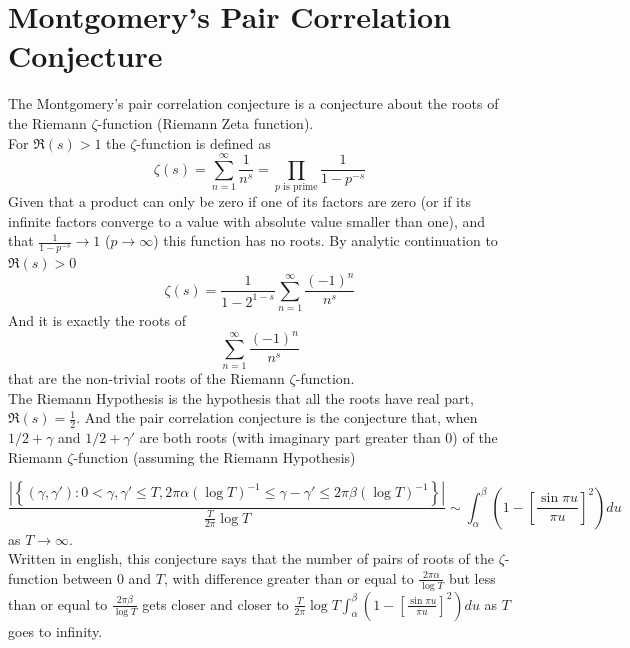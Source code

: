 \section{Montgomery's Pair Correlation Conjecture}
The Montgomery's pair correlation conjecture is a conjecture about the roots of the Riemann 
$\zeta$-function (Riemann Zeta function).
\\
For $\Re(s)>1$ the $\zeta$-function is defined as
\[\zeta(s)=\sum_{n=1}^\infty\frac{1}{n^s}=\prod_{p\text{ is prime}} \frac{1}{1-p^{-s}}\]
Given that a product can only be zero if one of its factors are zero (or if its infinite
factors converge to a value with absolute value smaller than one), and that 
$\frac{1}{1-p^{-s}}\rightarrow 1$ ($p\rightarrow\infty$) this function has no roots. 
By analytic continuation to $\Re(s)>0$
\[\zeta(s)=\frac{1}{1-2^{1-s}}\sum_{n=1}^\infty \frac{(-1)^n}{n^s}\]
And it is exactly the roots of 
\[\sum_{n=1}^\infty \frac{(-1)^n}{n^s}\]
that are the non-trivial roots of the Riemann $\zeta$-function. 
\\
The Riemann Hypothesis is the hypothesis that all the roots have real part, $\Re(s)=\frac{1}{2}$. 
And the pair correlation conjecture is the conjecture that, when $1/2+\gamma$ and $1/2+\gamma'$ 
are both roots (with imaginary part greater than 0) of the Riemann $\zeta$-function (assuming 
the Riemann Hypothesis)

\begin{equation}\label{first_formulation}
    \frac{\left|\left\{(\gamma, \gamma'): 0<\gamma, \gamma'\leq T, 2\pi \alpha 
    \left(\log T\right)^{-1}
    \leq \gamma-\gamma'\leq 2\pi \beta \left(\log T\right)^{-1}\right\}\right|}{\frac{T}{2\pi}
    \log T}\sim 
    \int_\alpha^\beta\left(1-\left[\frac{\sin \pi u}{\pi u}\right]^2\right)du
\end{equation}
as $T\rightarrow \infty$.
\\
Written in english, this conjecture says that the number of pairs of roots of the $\zeta$-function 
between $0$ and $T$, with difference greater than or equal to $\frac{2\pi \alpha}{\log T}$ but 
less than or equal to $\frac{2\pi \beta}{\log T}$ gets closer and closer to 
$\frac{T}{2\pi}\log T\int_\alpha^\beta \left(1-\left[\frac{\sin \pi u}{\pi u}\right]^2
\right)du$ as $T$ goes to infinity.
\\
